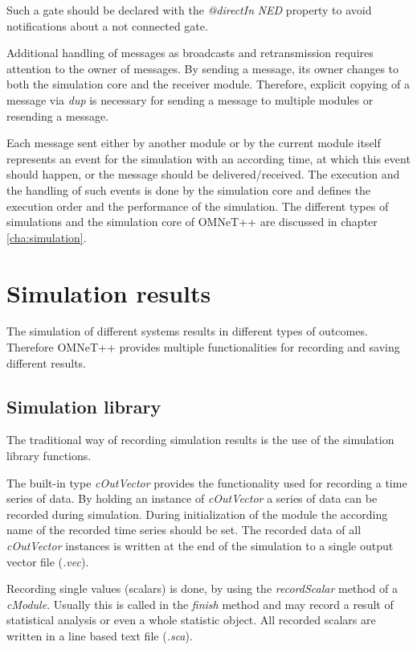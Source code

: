 Such a gate should be declared with the \emph{@directIn} \emph{NED} property to avoid notifications about a not connected gate. \cite[section 4.7.5]{omnet_manual}

Additional handling of messages as broadcasts and retransmission requires attention to the owner of messages.
By sending a message, its owner changes to both the simulation core and the receiver module.
Therefore, explicit copying of a message via \emph{dup} is necessary for sending a message to multiple modules or resending a message. \cite[section 4.7.3]{omnet_manual}

Each message sent either by another module or by the current module itself represents an event for the simulation with an according time, at which this event should happen, or the message should be delivered/received.
The execution and the handling of such events is done by the simulation core and defines the execution order and the performance of the simulation.
The different types of simulations and the simulation core of OMNeT++ are discussed in chapter \ref{cha:simulation}.


\section{Simulation results}
\label{sec:omnet_results}
The simulation of different systems results in different types of outcomes.
Therefore OMNeT++ provides multiple functionalities for recording and saving different results.


\subsection{Simulation library}
\label{sec:omnet_results_sim_lib}
The traditional way of recording simulation results is the use of the simulation library functions.

The built-in type \emph{cOutVector} provides the functionality used for recording a time series of data.
By holding an instance of \emph{cOutVector} a series of data can be recorded during simulation.
During initialization of the module the according name of the recorded time series should be set.
The recorded data of all \emph{cOutVector} instances is written at the end of the simulation to a single output vector file (\emph{.vec}). \cite[section 7.9.1]{omnet_manual}

Recording single values (scalars) is done, by using the \emph{recordScalar} method of a \emph{cModule}.
Usually this is called in the \emph{finish} method and may record a result of statistical analysis or even a whole statistic object.
All recorded scalars are written in a line based text file (\emph{.sca}). \cite[section 7.9.2]{omnet_manual}

